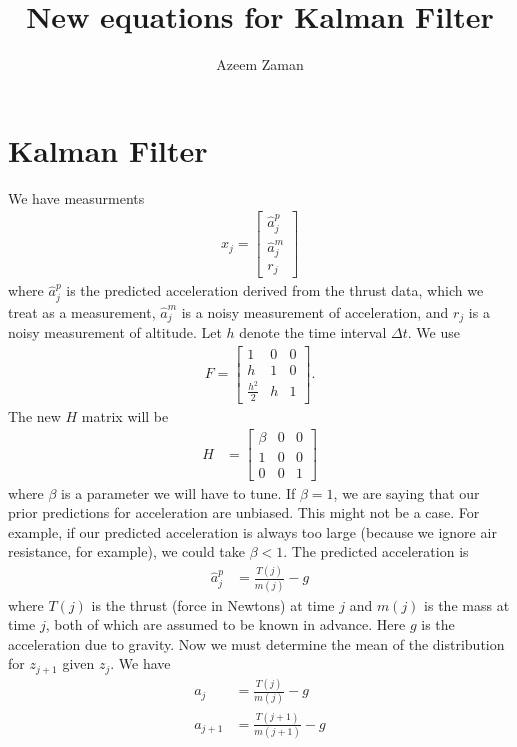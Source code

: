 \documentclass[11pt]{amsart}
\title{New equations for Kalman Filter}
\author{Azeem Zaman}
\begin{document}
\maketitle
\section{Kalman Filter}
We have measurments
\begin{align*}
x_{j} = \begin{bmatrix} \hat{a}_{j}^{p} \\
 \hat{a}_{j}^{m} \\ 
 r_{j} 
\end{bmatrix}
\end{align*}
where $\hat{a}_{j}^{p}$ is the predicted acceleration derived from the thrust data, which we treat as a measurement, $\hat{a}_{j}^{m}$ is a noisy measurement of acceleration, and $r_{j}$ is a noisy measurement of altitude.  Let $h$ denote the time interval $\Delta t$.  We use
\begin{align*}
F = \begin{bmatrix}
1 & 0 & 0 \\
h & 1 & 0 \\
\frac{h^{2}}{2} & h & 1
\end{bmatrix}.
\end{align*}
The new $H$ matrix will be
\begin{align*}
H &= \begin{bmatrix}
\beta & 0 & 0 \\
1 & 0 & 0 \\
0 & 0 & 1
\end{bmatrix}
\end{align*}
where $\beta$ is a parameter we will have to tune.  If $\beta = 1$, we are saying that our prior predictions for acceleration are unbiased.  This might not be a case.  For example, if our predicted acceleration is always too large (because we ignore air resistance, for example), we could take $\beta < 1$.  The predicted acceleration is
\begin{align*}
\hat{a}_{j}^{p} &= \frac{T(j)}{m(j)} - g
\end{align*}
where $T(j)$ is the thrust (force in Newtons) at time $j$ and $m(j)$ is the mass at time $j$, both of which are assumed to be known in advance.  Here $g$ is the acceleration due to gravity.  Now we must determine the mean of the distribution for $z_{j+1}$ given $z_{j}$.  We have
\begin{align*}
a_{j} &= \frac{T(j)}{m(j)} - g \\
a_{j+1} &= \frac{T(j+1)}{m(j+1)} - g
\end{align*}
\end{document}
